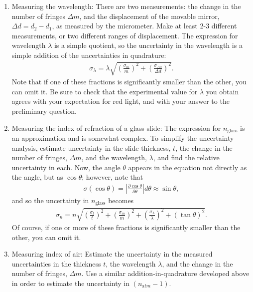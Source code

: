 \documentclass{tufte-handout}
\begin{document}
\begin{enumerate}

\item Measuring the wavelength: There are two measurements: the change in the
  number of fringes $\Delta m$, and the displacement of the movable mirror,
  $\Delta d = d_2-d_1$, as measured by the micrometer. Make at least 2-3
  different measurements, or two different ranges of displacement.  The
  expression for wavelength $\lambda$ is a simple quotient, so the uncertainty
  in the wavelength is a simple addition of the uncertainties in quadrature:
  \begin{align*}
    \sigma_\lambda = \lambda \sqrt{\left(\frac{\sigma_m}{m}\right)^2 +
      \left(\frac{\sigma_{\Delta d}}{\Delta d}\right)^2}.
  \end{align*}
  Note that if one of these fractions is significantly smaller than the other,
  you can omit it. Be sure to check that the experimental value
  for $\lambda$ you obtain agrees with your expectation for red light, and with
  your answer to the preliminary question.

\item Measuring the index of refraction of a glass slide: The expression for
  $n_{\mathrm{glass}}$ is an approximation and is somewhat complex. To simplify
  the uncertainty analysis, estimate uncertainty in the slide thickness, $t$,
  the change in the number of fringes, $\Delta m$, and the wavelength,
  $\lambda$, and find the relative uncertainty in each. Now, the angle $\theta$ appears
  in the equation not directly as the angle, but as $\cos\theta$; however, note
  that
  \begin{align*}
    \sigma(\cos\theta) = \left| \frac{\partial
      \cos\theta}{\partial\theta}\right| d\theta \approx \sin\theta,
  \end{align*}
  and so the uncertainty in $n_{\mathrm{glass}}$ becomes
  \begin{align*}
    \sigma_n = n \sqrt{\left(\frac{\sigma_t}{t}\right)^2 +
      \left(\frac{\sigma_m}{m}\right)^2 +
      \left(\frac{\sigma_\lambda}{\lambda}\right)^2 + (\tan\theta)^2}.
  \end{align*}
  Of course, if one or more of these fractions is significantly smaller than the
  other, you can omit it.

\item Measuring index of air: Estimate the uncertainty in the measured
  uncertainties in the thickness $t$, the wavelength $\lambda$, and the change
  in the number of fringes, $\Delta m$.  Use a similar addition-in-quadrature
  developed above in order to estimate the uncertainty in $(n_{\mathrm
    atm}-1)$. 
\end{enumerate}

\end{document}
